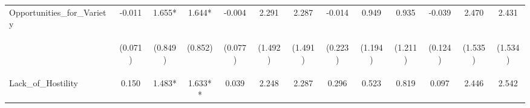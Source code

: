 \begin{tabular}{lcccccccccccc}
\noalign{\smallskip}Opportunities_for_Variety & -0.011 & 1.655* & 1.644* & -0.004 & 2.291 & 2.287 & -0.014 & 0.949 & 0.935 & -0.039 & 2.470 & 2.431\\
 & \begin{footnotesize}(0.071)\end{footnotesize} & \begin{footnotesize}(0.849)\end{footnotesize} & \begin{footnotesize}(0.852)\end{footnotesize} & \begin{footnotesize}(0.077)\end{footnotesize} & \begin{footnotesize}(1.492)\end{footnotesize} & \begin{footnotesize}(1.491)\end{footnotesize} & \begin{footnotesize}(0.223)\end{footnotesize} & \begin{footnotesize}(1.194)\end{footnotesize} & \begin{footnotesize}(1.211)\end{footnotesize} & \begin{footnotesize}(0.124)\end{footnotesize} & \begin{footnotesize}(1.535)\end{footnotesize} & \begin{footnotesize}(1.534)\end{footnotesize}\\
\noalign{\smallskip}Lack_of_Hostility & 0.150 & 1.483* & 1.633** & 0.039 & 2.248 & 2.287 & 0.296 & 0.523 & 0.819 & 0.097 & 2.446 & 2.542\\

\end{tabular}
